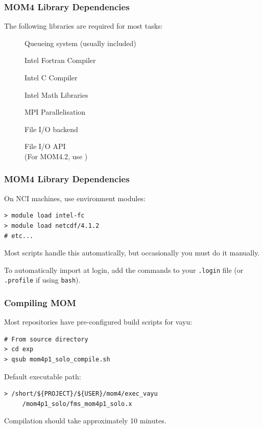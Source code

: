 \documentclass[red]{beamer}
\begin{document}
\begin{frame}[fragile]
    \frametitle{MOM4 Library Dependencies}

    The following libraries are required for most tasks:
    \begin{description}
        \item[] Queueing system (usually included)
        \item[] Intel Fortran Compiler
        \item[] Intel C Compiler
        \item[] Intel Math Libraries
        \item[] MPI Parallelisation
        \item[] File I/O backend
        \item[] File I/O API \\
            (For MOM4.2, use )
    \end{description}
\end{frame}

\begin{frame}[fragile]
    \frametitle{MOM4 Library Dependencies}
    
    On NCI machines, use environment modules:
    \begin{lstlisting}
> module load intel-fc
> module load netcdf/4.1.2
# etc...
    \end{lstlisting}
    Most scripts handle this automatically, but occasionally you must do it
    manually. 

    \vspace{10pt}

    To automatically import at login, add the commands to your
    \lstinline|.login| file (or \lstinline|.profile| if using
    \lstinline|bash|).
\end{frame}

\begin{frame}[fragile]
    \frametitle{Compiling MOM}
    
    Most repositories have pre-configured build scripts for vayu:
    \begin{lstlisting}
# From source directory
> cd exp
> qsub mom4p1_solo_compile.sh
    \end{lstlisting}
    
    Default executable path:
    \begin{lstlisting}
> /short/${PROJECT}/${USER}/mom4/exec_vayu
     /mom4p1_solo/fms_mom4p1_solo.x
    \end{lstlisting}
    
    Compilation should take approximately 10 minutes. 
\end{frame}
\end{document}

